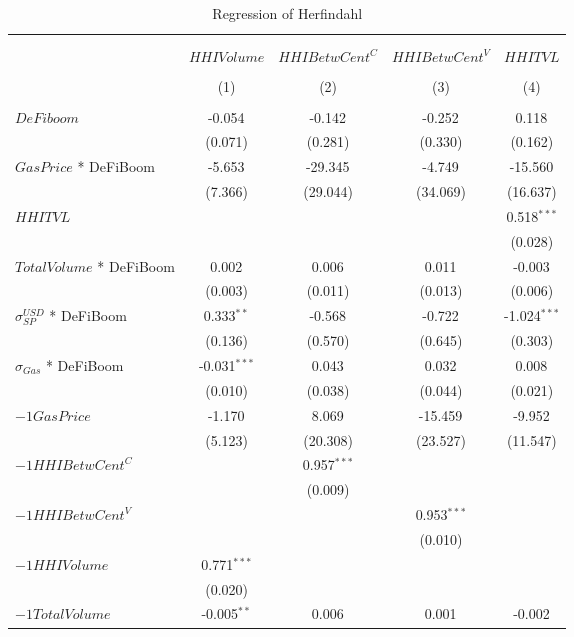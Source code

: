 \begin{table}[!htbp] \centering
  \caption{Regression of Herfindahl}
\begin{tabular}{@{\extracolsep{5pt}}lcccc}
\\[-1.8ex]\hline
\hline \\[-1.8ex]
\\[-1.8ex] & \multicolumn{1}{c}{${	 HHIVolume}$} & \multicolumn{1}{c}{${	 HHIBetwCent}^C$} & \multicolumn{1}{c}{${	 HHIBetwCent}^V$} & \multicolumn{1}{c}{${	 HHITVL}$}  \\
\\[-1.8ex] & (1) & (2) & (3) & (4) \\
\hline \\[-1.8ex]
 ${	 DeFiboom}$ & -0.054$^{}$ & -0.142$^{}$ & -0.252$^{}$ & 0.118$^{}$ \\
  & (0.071) & (0.281) & (0.330) & (0.162) \\
 ${	 GasPrice}$ * DeFiBoom & -5.653$^{}$ & -29.345$^{}$ & -4.749$^{}$ & -15.560$^{}$ \\
  & (7.366) & (29.044) & (34.069) & (16.637) \\
 ${	 HHITVL}$ & & & & 0.518$^{***}$ \\
  & & & & (0.028) \\
 ${	 TotalVolume}$ * DeFiBoom & 0.002$^{}$ & 0.006$^{}$ & 0.011$^{}$ & -0.003$^{}$ \\
  & (0.003) & (0.011) & (0.013) & (0.006) \\
 ${	 \sigma}^{USD}_{SP}$ * DeFiBoom & 0.333$^{**}$ & -0.568$^{}$ & -0.722$^{}$ & -1.024$^{***}$ \\
  & (0.136) & (0.570) & (0.645) & (0.303) \\
 ${	 \sigma}_{Gas}$ * DeFiBoom & -0.031$^{***}$ & 0.043$^{}$ & 0.032$^{}$ & 0.008$^{}$ \\
  & (0.010) & (0.038) & (0.044) & (0.021) \\
 ${	-1 GasPrice}$ & -1.170$^{}$ & 8.069$^{}$ & -15.459$^{}$ & -9.952$^{}$ \\
  & (5.123) & (20.308) & (23.527) & (11.547) \\
 ${	-1 HHIBetwCent}^C$ & & 0.957$^{***}$ & & \\
  & & (0.009) & & \\
 ${	-1 HHIBetwCent}^V$ & & & 0.953$^{***}$ & \\
  & & & (0.010) & \\
 ${	-1 HHIVolume}$ & 0.771$^{***}$ & & & \\
  & (0.020) & & & \\
 ${	-1 TotalVolume}$ & -0.005$^{**}$ & 0.006$^{}$ & 0.001$^{}$ & -0.002$^{}$ \\

\end{tabular}
\end{table}
